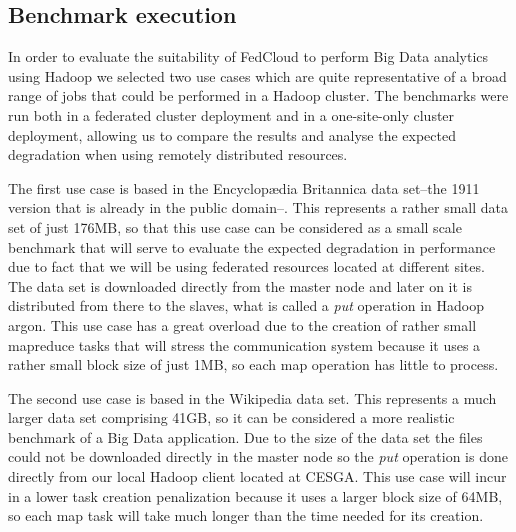 

\subsection{Benchmark execution}
\label{ssect-execution}

In order to evaluate the suitability of FedCloud to perform Big Data analytics using Hadoop we selected two use cases which are quite representative of a broad range of jobs that could be performed in a Hadoop cluster. The benchmarks were run both in a federated cluster deployment and in a one-site-only cluster deployment, allowing us to compare the results and analyse the expected degradation when using remotely distributed resources.




The first use case is based in the Encyclop{\ae}dia Britannica\cite{britannica} data set--the 1911 version that is already in the public domain--. This represents a rather small data set of just 176MB, so that this use case can be considered as a small scale benchmark that will serve to evaluate the expected degradation in performance due to fact that we will be using federated resources located at different sites. The data set is downloaded directly from the master node and later on it is distributed from there to the slaves, what is called a \emph{put} operation in Hadoop argon. This use case has a great overload due to the creation of rather small mapreduce tasks that will stress the communication system because it uses a rather small block size of just 1MB, so each map operation has little to process.

The second use case is based in the Wikipedia\cite{wikipedia} data set. This represents a much larger data set comprising 41GB, so it can be considered a more realistic benchmark of a Big Data application. Due to the size of the data set the files could not be downloaded directly in the master node so the \emph{put} operation is done directly from our local Hadoop client located at CESGA. This use case will incur in a lower task creation penalization because it uses a larger block size of 64MB, so each map task will take much longer than the time needed for its creation.


